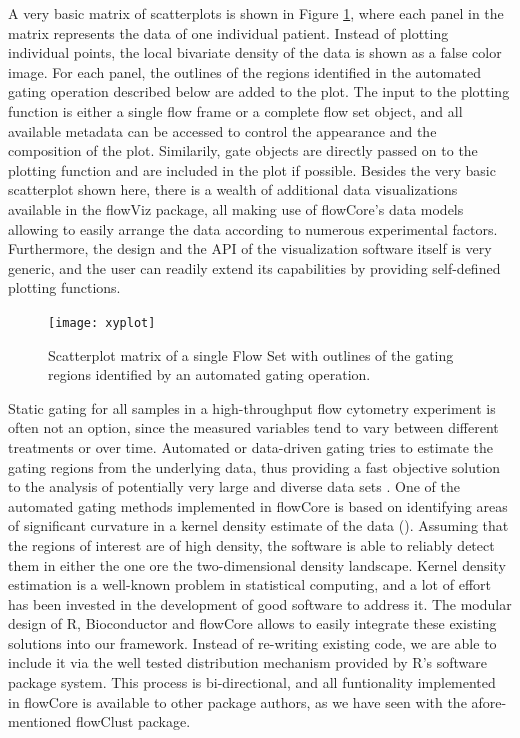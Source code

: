 \documentclass[12pt]{article}
\begin{document}
A very basic matrix of scatterplots is shown in Figure \ref{xyplot},
where each panel in the matrix represents the data of one individual
patient. Instead of plotting individual points, the local bivariate
density of the data is shown as a false color image. For each panel,
the outlines of the regions identified in the automated gating
operation described below are added to the plot. The input to the
plotting function is either a single flow frame or a complete flow set
object, and all available metadata can be accessed to control the
appearance and the composition of the plot. Similarily, gate objects
are directly passed on to the plotting function and are included in
the plot if possible. Besides the very basic scatterplot shown here,
there is a wealth of additional data visualizations available in the
flowViz package\cite{sarkar2008ufv}, all making use of flowCore's data
models allowing to easily arrange the data according to numerous
experimental factors. Furthermore, the design and the API of the
visualization software itself is very generic, and the user can
readily extend its capabilities by providing self-defined plotting
functions.

\begin{figure}[htbp]
\centering
\texttt{[image: xyplot]}
\caption{\label{xyplot}%
Scatterplot matrix of a single Flow Set with outlines of the gating
regions identified by an automated gating operation.}
\end{figure}

Static gating for all samples in a high-throughput flow cytometry
experiment is often not an option, since the measured variables tend
to vary between different treatments or over time. Automated or
data-driven gating tries to estimate the gating regions from the
underlying data, thus providing a fast objective solution to the
analysis of potentially very large and diverse data sets
\cite{lo2008agf}. One of the automated gating methods implemented in
flowCore is based on identifying areas of significant curvature in a
kernel density estimate of the data (\citep{wand2008}). Assuming that
the regions of interest are of high density, the software is able to
reliably detect them in either the one ore the two-dimensional density
landscape. Kernel density estimation is a well-known problem in
statistical computing, and a lot of effort has been invested in the
development of good software to address it. The modular design of R,
Bioconductor and flowCore allows to easily integrate these existing
solutions into our framework. Instead of re-writing existing code, we
are able to include it via the well tested distribution mechanism
provided by R's software package system. This process is
bi-directional, and all funtionality implemented in flowCore is
available to other package authors, as we have seen with the
afore-mentioned flowClust package.
\end{document}
